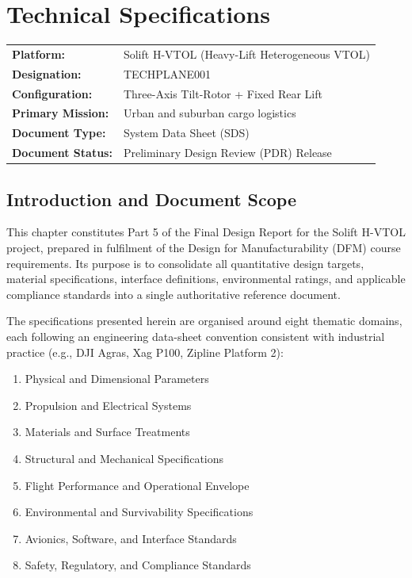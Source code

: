 \chapter{Technical Specifications}

\begin{table}[H]
\centering
\small
\begin{tabular}{ll}
\textbf{Platform:}           & Solift H-VTOL (Heavy-Lift Heterogeneous VTOL) \\
\textbf{Designation:}        & TECHPLANE001 \\
\textbf{Configuration:}      & Three-Axis Tilt-Rotor + Fixed Rear Lift \\
\textbf{Primary Mission:}    & Urban and suburban cargo logistics \\
\textbf{Document Type:}      & System Data Sheet (SDS) \\
\textbf{Document Status:}    & Preliminary Design Review (PDR) Release \\
\end{tabular}
\end{table}

\section{Introduction and Document Scope}

This chapter constitutes Part 5 of the Final Design Report for the Solift H-VTOL project, prepared in fulfilment of the Design for Manufacturability (DFM) course requirements. Its purpose is to consolidate all quantitative design targets, material specifications, interface definitions, environmental ratings, and applicable compliance standards into a single authoritative reference document.

The specifications presented herein are organised around eight thematic domains, each following an engineering data-sheet convention consistent with industrial practice (e.g., DJI Agras, Xag P100, Zipline Platform 2):

\begin{enumerate}[noitemsep]
  \item Physical and Dimensional Parameters
  \item Propulsion and Electrical Systems
  \item Materials and Surface Treatments
  \item Structural and Mechanical Specifications
  \item Flight Performance and Operational Envelope
  \item Environmental and Survivability Specifications
  \item Avionics, Software, and Interface Standards
  \item Safety, Regulatory, and Compliance Standards
\end{enumerate}

